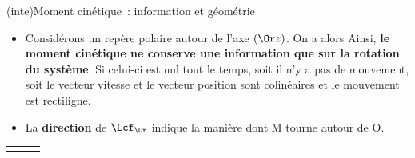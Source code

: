 \documentclass[../../main/main.tex]{subfiles}
\begin{document}
\begin{tcb*}[breakable](inte){Moment cinétique~: information et géométrie}
	\begin{itemize}
		\item Considérons un repère polaire autour de l'axe
		      $(\Or z)$. On a alors
		      \psw{
			      \[
				      \left\{
				      \begin{aligned}
					      \OM & = r\ur            \\
					      \vf & = \rp\ur + r\w\ut
				      \end{aligned}
				      \right.
				      \quad\Ra\quad
				      \Lcf_{\Or/\Rc} = (r\ur)\wedge m(\rp\ur+r\w\ut) = mr^2\w\uz
			      \]
		      }%
		      Ainsi, \textbf{le moment cinétique ne conserve une information que sur
			      la rotation du système}. Si celui-ci est nul tout le temps, soit il
		      n'y a pas de mouvement, soit le vecteur vitesse et le vecteur position
		      sont colinéaires et le mouvement est rectiligne.
		\item La \textbf{direction} de $\Lcf_{\Or}$
		      indique la manière dont M tourne autour de O.
	\end{itemize}
	\begin{center}
		\begin{tabularx}{\linewidth}{Y|Y|Y}
\end{tabularx}
\end{center}
\end{tcb*}
\end{document}
